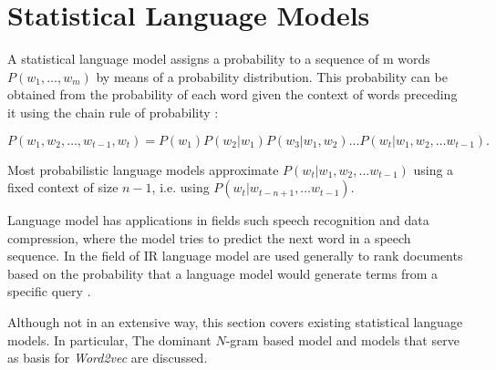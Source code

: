 





\section{Statistical Language Models}
\label{sec:relwork-language-models}

A statistical language model assigns a probability to a sequence of m
words $P(w_1,\ldots,w_m)$ by means of a probability distribution. 
This probability can be obtained from the probability of
each word given the context of words preceding it using the chain rule of probability \cite{Bengio:2008}:

\begin{equation}
\label{eq:lm_probability}
 P(w_1, w_2, \ldots, w_{t-1},w_t) = P(w_1) P(w_2|w_1) P(w_3|w_1,w_2) \ldots 
  P(w_t | w_1, w_2, \ldots w_{t-1}).
\end{equation}

Most probabilistic language models  approximate $P(w_t | w_1, w_2, \ldots
w_{t-1})$ using a fixed context of size $n-1$, i.e. using  $P(w_t |
w_{t-n+1}, \ldots w_{t-1})$.

Language model has applications in fields such speech recognition and data
compression, where the model tries to predict the next word in a speech
sequence. In the field of \ac{IR} language model are used generally 
to rank documents based on the probability that a language model would
generate terms  from a specific query \cite{Manning:1999:FSN:311445}.

Although not in an extensive way, this section covers existing statistical language
models. In particular, The dominant $N$-gram based model and models that
serve as basis for \textit{Word2vec} are discussed.


